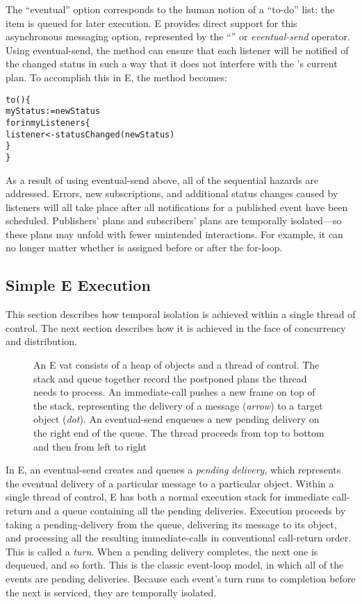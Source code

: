\documentclass{llncs}
\begin{document}
The ``eventual'' option corresponds to the human notion of a ``to-do''
list: the item is queued for later execution. E provides direct
support for this asynchronous messaging option, represented by the
``\code{<-}'' or \emph{eventual-send} operator. Using eventual-send,
the  method can ensure that each listener will be
notified of the changed status in such a way that it does not
interfere with the 's current plan.  To accomplish
this in E, the  method becomes:
%
\begin{alltt}
    to () \{
        myStatus := newStatus
        for  in myListeners \{
            listener <- statusChanged(newStatus)
        \}
    \}
\end{alltt}
%
As a result of using eventual-send above, all of the sequential
hazards are addressed. Errors, new subscriptions, and additional
status changes caused by listeners will all take place after all
notifications for a published event have been scheduled.  Publishers'
plans and subscribers' plans are temporally isolated---so these
plans may unfold with fewer unintended interactions. For example, it
can no longer matter whether  is assigned before or
after the for-loop.

\subsection{Simple E Execution}

This section describes how temporal isolation is achieved within a
single thread of control.  The next section describes how it is
achieved in the face of concurrency and distribution.

\begin{figure}
\centerline{}
\caption{An E vat consists of a heap of objects and a thread of
  control. The stack and queue together record the postponed plans the
  thread needs to process. An immediate-call pushes a new frame on top
  of the stack, representing the delivery of a message ({\it arrow})
  to a target object ({\it dot}). An eventual-send enqueues a new
  pending delivery on the right end of the queue. The thread proceeds
  from top to bottom and then from left to right}
\label{fig:stackvat}
\end{figure}

In E, an eventual-send creates and queues a \emph{pending delivery},
which represents the eventual delivery of a particular message to a
particular object.  Within a single thread of control, E has both a
normal execution stack for immediate call-return and a queue
containing all the pending deliveries. Execution proceeds by taking a
pending-delivery from the queue, delivering its message to its object,
and processing all the resulting immediate-calls in conventional
call-return order.  This is called a \emph{turn}.  When a pending
delivery completes, the next one is dequeued, and so forth.  This is
the classic event-loop model, in which all of the events are pending
deliveries. Because each event's turn runs to completion before the
next is serviced, they are temporally isolated.
\end{document}
